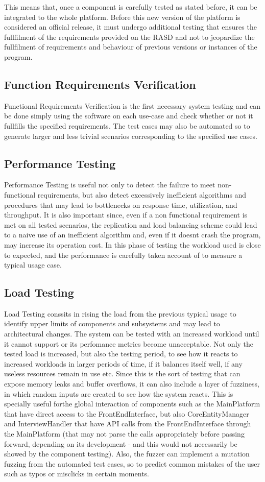 This means that, once a component is carefully tested as stated before, it can be integrated to the whole platform. Before this new version of the platform is considered an official release, it must undergo additional testing that ensures the fullfilment of the requirements provided on the RASD and not to jeopardize the fullfilment of requirements and behaviour of previous versions or instances of the program.
\subsection{Function Requirements Verification}
Functional Requirements Verification is the first necessary system testing and can be done simply using the software on each use-case and check whether or not it fullfills the specified requirements. The test cases may also be automated so to generate larger and less trivial scenarios corresponding to the specified use cases.
\subsection{Performance Testing}
Performance Testing is useful not only to detect the failure to meet non-functional requirements, but also detect excessively inefficient algorithms and procedures that may lead to bottlenecks on response time, utilization, and throughput. It is also important since, even if a non functional requirement is met on all tested scenarios, the replication and load balancing scheme could lead to a naive use of an inefficient algorithm and, even if it doesnt crash the program, may increase its operation cost. In this phase of testing the workload used is close to expected, and the performance is carefully taken account of to measure a typical usage case.
\subsection{Load Testing}
Load Testing conssits in rising the load from the previous typical usage to identify upper limits of components and subsystems and may lead to architectural changes. The system can be tested with an increased workload until it cannot support or its perfomance metrics become unacceptable. Not only the tested load is increased, but also the testing period, to see how it reacts to increased workloads in larger periods of time, if it balances itself well, if any useless resources remain in use etc. Since this is the sort of testing that can expose memory leaks and buffer overflows, it can also include a layer of fuzziness, in which random inputs are created to see how the system reacts. This is specially useful forthe global interaction of components such as the MainPlatform that have direct access to the FrontEndInterface, but also CoreEntityManager and InterviewHandler that have API calls from the FrontEndInterface through  the MainPlatform (that may not parse the calls appropriately before passing forward, depending on its development - and this would not necessarily be showed by the component testing). Also, the fuzzer can implement a mutation fuzzing from the automated test cases, so to predict common mistakes of the user such as typos or misclicks in certain moments.
